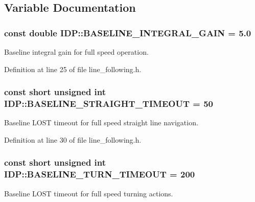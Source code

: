 \subsection{Variable Documentation}
\hypertarget{namespaceIDP_a13d57d0e366139689356754d049ca38b}{
\subsubsection[{BASELINE\_\-INTEGRAL\_\-GAIN}]{\setlength{\rightskip}{0pt plus 5cm}const double {\bf IDP::BASELINE\_\-INTEGRAL\_\-GAIN} = 5.0}}
\label{namespaceIDP_a13d57d0e366139689356754d049ca38b}


Baseline integral gain for full speed operation. 



Definition at line 25 of file line\_\-following.h.

\hypertarget{namespaceIDP_ad49ae86fe58241291415f56ea64c8ac8}{
\subsubsection[{BASELINE\_\-STRAIGHT\_\-TIMEOUT}]{\setlength{\rightskip}{0pt plus 5cm}const short unsigned int {\bf IDP::BASELINE\_\-STRAIGHT\_\-TIMEOUT} = 50}}
\label{namespaceIDP_ad49ae86fe58241291415f56ea64c8ac8}


Baseline LOST timeout for full speed straight line navigation. 



Definition at line 30 of file line\_\-following.h.

\hypertarget{namespaceIDP_ad315440c84ff5573297a088ffafc1b92}{
\subsubsection[{BASELINE\_\-TURN\_\-TIMEOUT}]{\setlength{\rightskip}{0pt plus 5cm}const short unsigned int {\bf IDP::BASELINE\_\-TURN\_\-TIMEOUT} = 200}}
\label{namespaceIDP_ad315440c84ff5573297a088ffafc1b92}


Baseline LOST timeout for full speed turning actions. 



